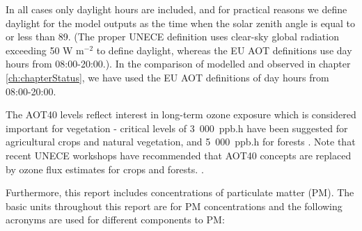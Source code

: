 \begin{description}
In all cases only daylight hours are included, and for practical
reasons we define daylight for the model outputs as the time when the
solar zenith angle is equal to or less than 89\degrees. (The proper
UNECE definition uses clear-sky global radiation exceeding 50 W
m$^{-2}$ to define daylight, whereas the EU AOT definitions use day
hours from 08:00-20:00.).
In the comparison of modelled and observed \aotucf in chapter \ref{ch:chapterStatus}, we have used the EU AOT definitions of day
hours from 08:00-20:00.

The AOT40 levels reflect interest in long-term ozone exposure which is
considered important for vegetation - critical levels of 3~000~ppb.h
have been suggested for agricultural crops and natural vegetation, and
5~000~ppb.h for forests \cite[]{MappingManual:Veg}.
Note that recent  UNECE workshops have recommended that AOT40 concepts
are replaced by ozone flux estimates for crops and forests.
\citep[See also][]{R2010:Fluxes}.
\end{description}



Furthermore, this report includes concentrations of particulate matter (PM). The basic units \linebreak throughout this report
are \ug for PM concentrations and the following acronyms are used for different components to PM:

